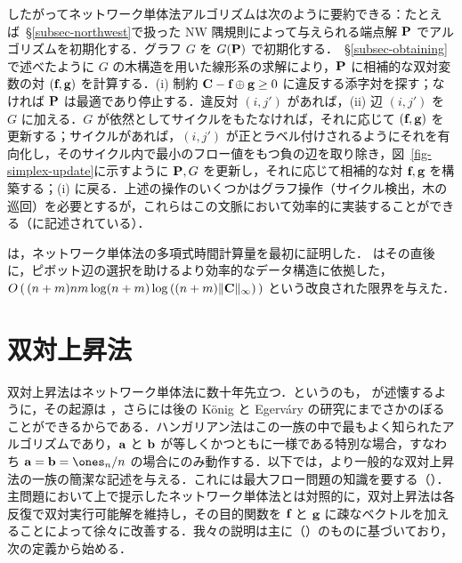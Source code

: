 したがってネットワーク単体法アルゴリズムは次のように要約できる：たとえば~\S\ref{subsec-northwest}で扱った NW 隅規則によって与えられる端点解 $\P$ でアルゴリズムを初期化する．グラフ $G$ を $G(\P)$ で初期化する．~\S\ref{subsec-obtaining}で述べたように $G$ の木構造を用いた線形系の求解により，$\P$ に相補的な双対変数の対 $(\fD,\gD)$ を計算する．{(i)} 制約 $\C- \fD\oplus \gD\geq 0$ に違反する添字対を探す；なければ $\P$ は最適であり停止する．違反対 $(i,j')$ があれば，{(ii)} 辺 $(i,j')$ を $G$ に加える．$G$ が依然としてサイクルをもたなければ，それに応じて $(\fD,\gD)$ を更新する；サイクルがあれば，$(i,j')$ が正とラベル付けされるようにそれを有向化し，そのサイクル内で最小のフロー値をもつ負の辺を取り除き，図~\ref{fig-simplex-update}に示すように $\P,G$ を更新し，それに応じて相補的な対 $\fD,\gD$ を構築する；{(i)} に戻る．上述の操作のいくつかはグラフ操作（サイクル検出，木の巡回）を必要とするが，これらはこの文脈において効率的に実装することができる（\cite[\S5]{bertsekas1998network}に記述されている）．

\citet{Orlin1997} は，ネットワーク単体法の多項式時間計算量を最初に証明した．\citet{Tarjan1997} はその直後に，ピボット辺の選択を助けるより効率的なデータ構造に依拠した，$O\left(\,(n+m)nm \log(n+m)\log\left((n+m)\|\C\|_\infty\right)\,\right)$ という改良された限界を与えた．




\section{双対上昇法}\label{s-dual-ascent}

双対上昇法はネットワーク単体法に数十年先立つ．というのも，\citet{Kuhn1955} が述懐するように，その起源は \citet{borchardt1865investigando}，さらには後の K\"onig と Egerv\'ary の研究にまでさかのぼることができるからである．ハンガリアン法はこの一族の中で最もよく知られたアルゴリズムであり，$\a$ と $\b$ が等しくかつともに一様である特別な場合，すなわち $\a=\b=\ones_n/n$ の場合にのみ動作する．以下では，より一般的な双対上昇法の一族の簡潔な記述を与える．これには最大フロー問題の知識を要する（\cite[\S7.5]{bertsimas1997introduction}）．主問題において上で提示したネットワーク単体法とは対照的に，双対上昇法は各反復で双対実行可能解を維持し，その目的関数を $\fD$ と $\gD$ に疎なベクトルを加えることによって徐々に改善する．我々の説明は主に（\cite[\S7.7]{bertsimas1997introduction}）のものに基づいており，次の定義から始める．

